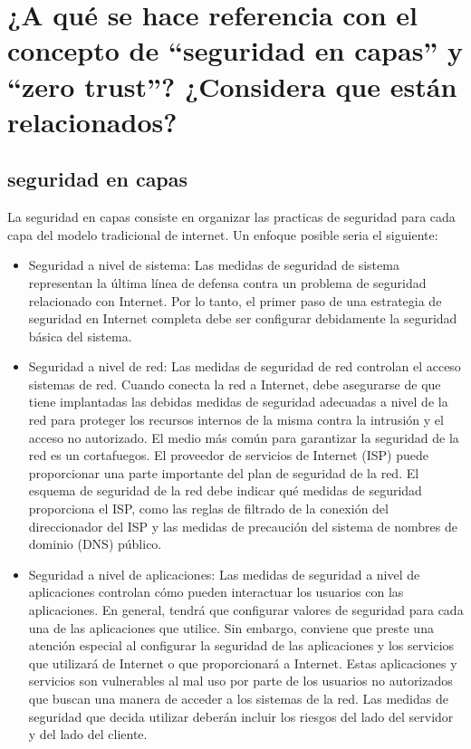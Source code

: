 \documentclass{article}
\begin{document}
	\section{¿A qué se hace referencia con el concepto de “seguridad en capas” y “zero trust”? ¿Considera que están relacionados?}
		\subsection{seguridad en capas}
			La seguridad en capas consiste en organizar las practicas de seguridad para cada capa del modelo tradicional de internet. 
			Un enfoque posible seria el siguiente:
			\begin{itemize}
				\item Seguridad a nivel de sistema: Las medidas de seguridad de sistema representan la última línea de defensa contra un problema de seguridad relacionado con Internet. Por lo tanto, el primer paso de una estrategia de seguridad en Internet completa debe ser configurar debidamente la seguridad básica del sistema.
				
				\item Seguridad a nivel de red: Las medidas de seguridad de red controlan el acceso sistemas de red. Cuando conecta la red a Internet, debe asegurarse de que tiene implantadas las debidas medidas de seguridad adecuadas a nivel de la red para proteger los recursos internos de la misma contra la intrusión y el acceso no autorizado. El medio más común para garantizar la seguridad de la red es un cortafuegos. El proveedor de servicios de Internet (ISP) puede proporcionar una parte importante del plan de seguridad de la red. El esquema de seguridad de la red debe indicar qué medidas de seguridad proporciona el ISP, como las reglas de filtrado de la conexión del direccionador del ISP y las medidas de precaución del sistema de nombres de dominio (DNS) público.
				
				\item Seguridad a nivel de aplicaciones: Las medidas de seguridad a nivel de aplicaciones controlan cómo pueden interactuar los usuarios con las aplicaciones. En general, tendrá que configurar valores de seguridad para cada una de las aplicaciones que utilice. Sin embargo, conviene que preste una atención especial al configurar la seguridad de las aplicaciones y los servicios que utilizará de Internet o que proporcionará a Internet. Estas aplicaciones y servicios son vulnerables al mal uso por parte de los usuarios no autorizados que buscan una manera de acceder a los sistemas de la red. Las medidas de seguridad que decida utilizar deberán incluir los riesgos del lado del servidor y del lado del cliente.
				

\end{itemize}
\end{document}
